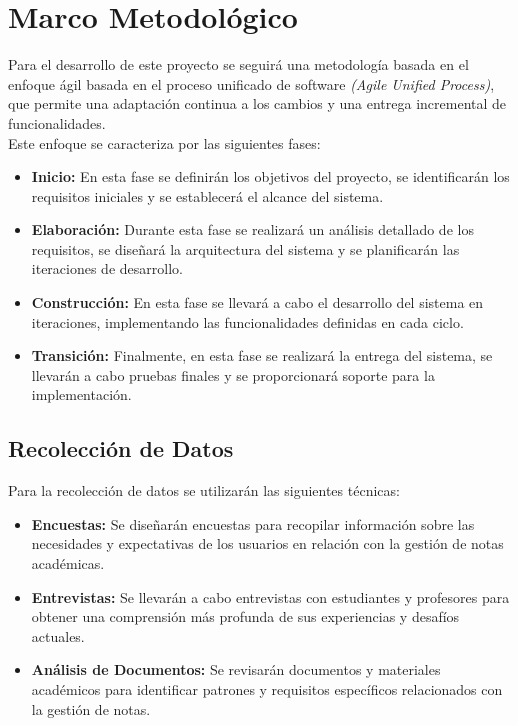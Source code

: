 \chapter{Marco Metodológico}
\thispagestyle{fancy}


Para el desarrollo de este proyecto se seguirá una metodología basada en el enfoque ágil basada en el proceso unificado de software \textit{(Agile Unified Process)}, que permite una adaptación continua a los cambios y una entrega incremental de funcionalidades.\\
Este enfoque se caracteriza por las siguientes fases:
\begin{itemize}
    \item \textbf{Inicio:} En esta fase se definirán los objetivos del proyecto, se identificarán los requisitos iniciales y se establecerá el alcance del sistema.
    \item \textbf{Elaboración:} Durante esta fase se realizará un análisis detallado de los requisitos, se diseñará la arquitectura del sistema y se planificarán las iteraciones de desarrollo.
    \item \textbf{Construcción:} En esta fase se llevará a cabo el desarrollo del sistema en iteraciones, implementando las funcionalidades definidas en cada ciclo.
    \item \textbf{Transición:} Finalmente, en esta fase se realizará la entrega del sistema, se llevarán a cabo pruebas finales y se proporcionará soporte para la implementación.
\end{itemize}

\section{Recolección de Datos}
Para la recolección de datos se utilizarán las siguientes técnicas:
\begin{itemize}
    \item \textbf{Encuestas:} Se diseñarán encuestas para recopilar información sobre las necesidades y expectativas de los usuarios en relación con la gestión de notas académicas.
    \item \textbf{Entrevistas:} Se llevarán a cabo entrevistas con estudiantes y profesores para obtener una comprensión más profunda de sus experiencias y desafíos actuales.
    \item \textbf{Análisis de Documentos:} Se revisarán documentos y materiales académicos para identificar patrones y requisitos específicos relacionados con la gestión de notas.
\end{itemize}   

